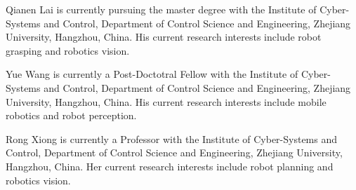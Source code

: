 \documentclass[journal]{IEEEtran}
\begin{document}
\begin{IEEEbiography}{Qianen Lai}
is currently pursuing the master degree with the Institute of Cyber-Systems and Control, Department of Control Science and Engineering, Zhejiang University, Hangzhou, China. His current research interests include robot grasping and robotics vision.
\end{IEEEbiography}
\begin{IEEEbiography}{Yue Wang}
 is currently a Post-Doctotral Fellow with the Institute of Cyber-Systems and Control, Department of Control Science and Engineering, Zhejiang University, Hangzhou, China. His current research interests include mobile robotics and robot perception.
\end{IEEEbiography}

\begin{IEEEbiography}{Rong Xiong}
is currently a Professor with the Institute of Cyber-Systems and Control, Department of Control Science and Engineering, Zhejiang University, Hangzhou, China. Her current research interests include robot planning and robotics vision.
\end{IEEEbiography}




\end{document}
